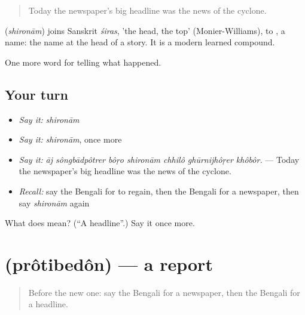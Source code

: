 \begin{quote}
Today the newspaper's big headline was the news of the cyclone.
\end{quote}

\begin{cousinweb}
\textbf{} (\emph{shironām}) joins Sanskrit \emph{śiras}, 'the head, the top' (Monier-Williams), to \textbf{}, a name: the name at the head of a story. It is a modern learned compound.
\end{cousinweb}

\begin{grammarlens}[title={What you've built}]
One more word for telling what happened.
\end{grammarlens}

\subsection*{Your turn}
\begin{itemize}
\raggedright
  \item \emph{Say it:} \emph{shironām}
  \item \emph{Say it:} \emph{shironām}, once more
  \item \emph{Say it:} \emph{āj sôngbādpôtrer bôṛo shironām chhilô ghūrnijhôṛer khôbôr.} — Today the newspaper's big headline was the news of the cyclone.
  \item \emph{Recall:} say the Bengali for to regain, then the Bengali for a newspaper, then say \emph{shironām} again
\end{itemize}

\begin{tcolorbox}[breakable,colback=teal!4,colframe=teal!35!black,title={Before you move on}]
What does  mean? (\textquotedblleft{}A headline\textquotedblright{}.) Say it once more.
\end{tcolorbox}
\section[\texorpdfstring{\bn{প্রতিবেদন} (prôtibedôn)}{প্রতিবেদন (prôtibedôn)}]{ (prôtibedôn) — a report}

\label{lesson:BN-C296-protibedon}



\begin{quote}
Before the new one: say the Bengali for a newspaper, then the Bengali for a headline.
\end{quote}

